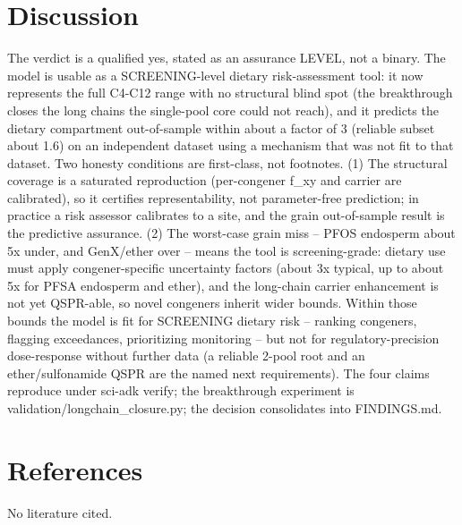 \documentclass{article}
\begin{document}
\section{Discussion}
The verdict is a qualified yes, stated as an assurance LEVEL, not a binary. The model is usable as a SCREENING-level dietary risk-assessment tool: it now represents the full C4-C12 range with no structural blind spot (the breakthrough closes the long chains the single-pool core could not reach), and it predicts the dietary compartment out-of-sample within about a factor of 3 (reliable subset about 1.6) on an independent dataset using a mechanism that was not fit to that dataset. Two honesty conditions are first-class, not footnotes. (1) The structural coverage is a saturated reproduction (per-congener f\_xy and carrier are calibrated), so it certifies representability, not parameter-free prediction; in practice a risk assessor calibrates to a site, and the grain out-of-sample result is the predictive assurance. (2) The worst-case grain miss -- PFOS endosperm about 5x under, and GenX/ether over -- means the tool is screening-grade: dietary use must apply congener-specific uncertainty factors (about 3x typical, up to about 5x for PFSA endosperm and ether), and the long-chain carrier enhancement is not yet QSPR-able, so novel congeners inherit wider bounds. Within those bounds the model is fit for SCREENING dietary risk -- ranking congeners, flagging exceedances, prioritizing monitoring -- but not for regulatory-precision dose-response without further data (a reliable 2-pool root and an ether/sulfonamide QSPR are the named next requirements). The four claims reproduce under sci-adk verify; the breakthrough experiment is validation/longchain\_closure.py; the decision consolidates into FINDINGS.md.

\section{References}
No literature cited.
\end{document}
